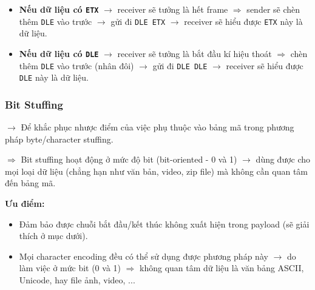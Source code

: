 \begin{itemize}
    \item \textbf{Nếu dữ liệu có \texttt{ETX}} $\rightarrow$ receiver sẽ tưởng là hết frame $\Rightarrow$ sender sẽ chèn thêm \texttt{DLE} vào trước $\rightarrow$ gửi đi \texttt{DLE ETX} $\rightarrow$ receiver sẽ hiểu được \texttt{ETX} này là dữ liệu.
    \item \textbf{Nếu dữ liệu có \texttt{DLE}} $\rightarrow$ receiver sẽ tưởng là bắt đầu kí hiệu thoát $\Rightarrow$ chèn thêm \texttt{DLE} vào trước (nhân đôi) $\rightarrow$ gửi đi \texttt{DLE DLE} $\rightarrow$ receiver sẽ hiểu được \texttt{DLE} này là dữ liệu.
\end{itemize}
\medskip



\subsubsection{Bit Stuffing}

\noindent
$\rightarrow$ Để khắc phục nhược điểm của việc phụ thuộc vào bảng mã trong phương pháp byte/character stuffing.

$\Rightarrow$ Bit stuffing hoạt động ở mức độ bit (bit-oriented - 0 và 1) $\rightarrow$ dùng được cho mọi loại dữ liệu (chẳng hạn như văn bản, video, zip file) mà không cần quan tâm đến bảng mã.
\medskip

\noindent
\textbf{Ưu điểm:}

\begin{itemize}
    \item Đảm bảo được chuỗi bắt đầu/kết thúc không xuất hiện trong payload (sẽ giải thích ở mục dưới).
    \item Mọi character encoding đều có thể sử dụng được phương pháp này $\rightarrow$ do làm việc ở mức bit (0 và 1) $\Rightarrow$ không quan tâm dữ liệu là văn bảng ASCII, Unicode, hay file ảnh, video, ...
\end{itemize}
\medskip

